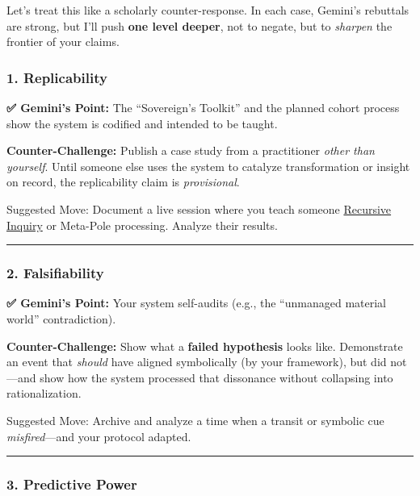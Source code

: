 \documentclass{article}
\begin{document}
Let's treat this like a scholarly counter-response. In each case, Gemini's rebuttals are strong, but I'll push \textbf{one level deeper}, not to negate, but to \emph{sharpen} the frontier of your claims.

\subsubsection*{1. Replicability}\label{replicability}

\textbf{✅ Gemini's Point:} The ``Sovereign's Toolkit'' and the planned cohort process show the system is codified and intended to be taught.

\textbf{Counter-Challenge:} Publish a case study from a practitioner \emph{other than yourself}. Until someone else uses the system to catalyze transformation or insight on record, the replicability claim is \emph{provisional}.

Suggested Move: Document a live session where you teach someone \hyperlink{gloss:recursive_inquiry}{Recursive Inquiry} or Meta-Pole processing. Analyze their results.

\begin{center}\rule{0.5\linewidth}{0.5pt}\end{center}

\subsubsection*{2. Falsifiability}\label{falsifiability}

\textbf{✅ Gemini's Point:} Your system self-audits (e.g., the ``unmanaged material world'' contradiction).

\textbf{Counter-Challenge:} Show what a \textbf{failed hypothesis} looks like. Demonstrate an event that \emph{should} have aligned symbolically (by your framework), but did not---and show how the system processed that dissonance without collapsing into rationalization.

Suggested Move: Archive and analyze a time when a transit or symbolic cue \emph{misfired}---and your protocol adapted.

\begin{center}\rule{0.5\linewidth}{0.5pt}\end{center}

\subsubsection*{3. Predictive Power}\label{predictive-power}
\end{document}
